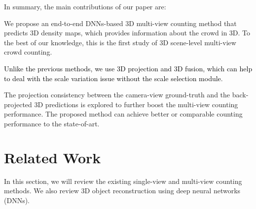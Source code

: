 \documentclass[letterpaper]{article} %
\newcommand{\NOTE}[1]{\textcolor{black}{}}
\newcommand{\zq}[1]{\textcolor{black}{#1}} %
\begin{document}
In summary, the main contributions of our paper are:
\begin{compactitem}
  \item We propose an end-to-end DNNs-based 3D multi-view counting method that predicts 3D density maps, which provides information about the crowd in 3D. To the best of our knowledge, this is the first study of 3D scene-level multi-view crowd counting.
  \item \zq{Unlike the previous methods, we use 3D projection and 3D fusion, which can help to deal with the scale variation issue without the scale selection module}.
  \item The projection consistency between the camera-view ground-truth and the back-projected 3D predictions is explored to further boost the multi-view counting performance. The proposed method can achieve better or comparable counting performance to the state-of-art.
\end{compactitem}


\section{Related Work}
In this section, we will review the existing single-view and multi-view counting methods. We also review 3D object reconstruction using deep neural networks (DNNs).
\end{document}
